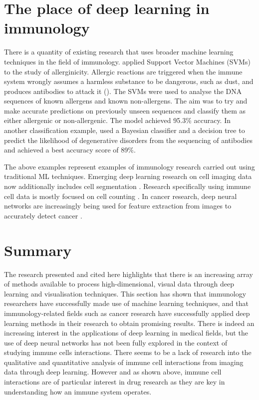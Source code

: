 \section{The place of deep learning in immunology}

There is a quantity of existing research that uses broader machine learning techniques in the field of immunology. \citet{muh_allerhunter_2009} applied Support Vector Machines (SVMs) to the study of allerginicity. Allergic reactions are triggered when the immune system wrongly assumes a harmless substance to be dangerous, such as dust, and produces antibodies to attack it  (\cite{https://www.immunology.org/policy-and-public-affairs/briefings-and-position-statements/allergy}). The SVMs were used to analyse the DNA sequences of known allergens and known non-allergens. The aim was to try and make accurate predictions on previously unseen sequences and classify them as either allergenic or non-allergenic. The model achieved 95.3\% accuracy.  In another classification example, \citet{david_using_2010} used a Bayesian classifier and a decision tree to predict the likelihood of degenerative disorders from the sequencing of antibodies and achieved a best accuracy score of 89\%.

The above examples represent examples of immunology research carried out using traditional ML techniques. Emerging deep learning research on cell imaging data now additionally includes cell segmentation \citep{al-kofahi_deep_2018}. Research specifically using immune cell data is mostly focused on cell counting \citep{turkki_antibody-supervised_2016, aprupe_robust_2019}. In cancer research, deep neural networks are increasingly being used for feature extraction from images to accurately detect cancer \citep{litjens_deep_2016, bychkov_deep_2018}.

\section{Summary}

The research presented and cited here highlights that there is an increasing array of methods available to process high-dimensional, visual data through deep learning and visualisation techniques. This section has shown that immunology researchers have successfully made use of machine learning techniques, and that immunology-related fields such as cancer research have successfully applied deep learning methods in their research to obtain promising results. There is indeed an increasing interest in the applications of deep learning in medical fields, but the use of deep neural networks has not been fully explored in the context of studying immune cells interactions. There seems to be a lack of research into the qualitative and quantitative analysis of immune cell interactions from imaging data through deep learning. However and as shown above, immune cell interactions are of particular interest in drug research as they are key in understanding how an immune system operates.

